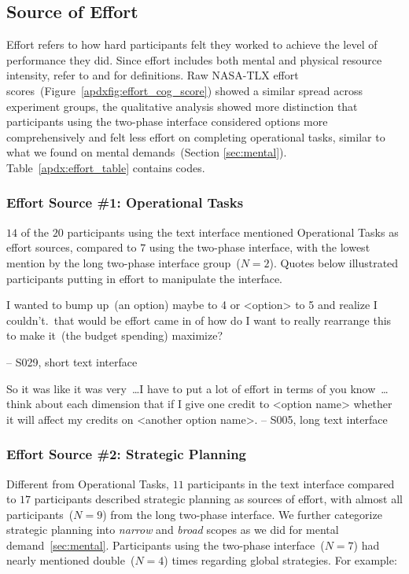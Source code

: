 \subsection{Source of Effort}
\label{apdx:effort}
Effort refers to how hard participants felt they worked to achieve the level of performance they did. Since effort includes both mental and physical resource intensity, refer to  and  for definitions. Raw NASA-TLX effort scores~(Figure~\ref{apdxfig:effort_cog_score}) showed a similar spread across experiment groups, the qualitative analysis showed more distinction that participants using the two-phase interface considered options more comprehensively and felt less effort on completing operational tasks, similar to what we found on mental demands~(Section \ref{sec:mental}). Table~\ref{apdx:effort_table} contains codes.

\subsubsection{Effort Source \#1: Operational Tasks} $14$ of the $20$ participants using the text interface mentioned Operational Tasks as effort sources, compared to $7$ using the two-phase interface, with the lowest mention by the long two-phase interface group~($N=2$). Quotes below illustrated participants putting in effort to manipulate the interface.
\begin{displayquote}
I wanted to bump up~(an option) maybe to 4 or <option> to 5 and realize I couldn't.~\bracketellipsis that would be effort came in of how do I want to really rearrange this to make it~(the budget spending) maximize?

\noindent \hfill -- S029, short text interface
\end{displayquote}
\begin{displayquote}
So it was like it was very~\ldots I have to put a lot of effort in terms of you know~\ldots think about each dimension that if I give one credit to <option name> whether it will affect my credits on <another option name>. \noindent\hfill -- S005, long text interface
\end{displayquote}

\subsubsection{Effort Source \#2: Strategic Planning} Different from Operational Tasks, $11$ participants in the text interface compared to $17$ participants described strategic planning as sources of effort, with almost all participants~($N=9$) from the long two-phase interface. We further categorize strategic planning into \textit{narrow} and \textit{broad} scopes as we did for mental demand~\cref{sec:mental}. Participants using the two-phase interface~($N=7$) had nearly mentioned double~($N=4$) times regarding global strategies. For example:

